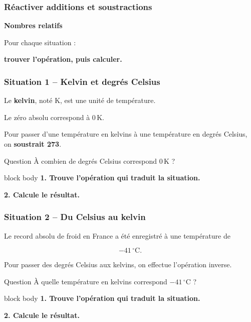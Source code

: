 \documentclass[aspectratio=169]{beamer}
\newcommand{\consigne}{%
\begin{beamercolorbox}[
  rounded=true,
  sep=0.8em,
  wd=\textwidth
]{block body}
\centering
\textbf{1. Trouve l'opération qui traduit la situation.}

\medskip

\textbf{2. Calcule le résultat.}
\end{beamercolorbox}
}
\begin{document}
\begin{frame}
\frametitle{Réactiver additions et soustractions}

\centering

{\Huge\bfseries Nombres relatifs}

\vspace{0.6cm}

{\Large
Pour chaque situation :

\medskip

\textbf{trouver l'opération, puis calculer.}
}

\end{frame}

\begin{frame}
\frametitle{Situation 1 -- Kelvin et degrés Celsius}

Le \textbf{kelvin}, noté \(\mathrm{K}\), est une unité de température.

\medskip

Le zéro absolu correspond à \(0\,\mathrm{K}\).

\medskip

Pour passer d'une température en kelvins à une température
en degrés Celsius, on \textbf{soustrait 273}.

\vspace{0.6cm}

\begin{block}{Question}
À combien de degrés Celsius correspond \(0\,\mathrm{K}\) ?
\end{block}

\vfill

\consigne

\end{frame}

\begin{frame}
\frametitle{Situation 2 -- Du Celsius au kelvin}

Le record absolu de froid en France a été enregistré
à une température de

\[
-41\,^\circ\mathrm{C}.
\]

\vspace{0.5cm}

Pour passer des degrés Celsius aux kelvins,
on effectue l'opération inverse.

\vspace{0.4cm}

\begin{block}{Question}
À quelle température en kelvins correspond
\(-41\,^\circ\mathrm{C}\) ?
\end{block}

\vfill

\consigne

\end{frame}
\end{document}

